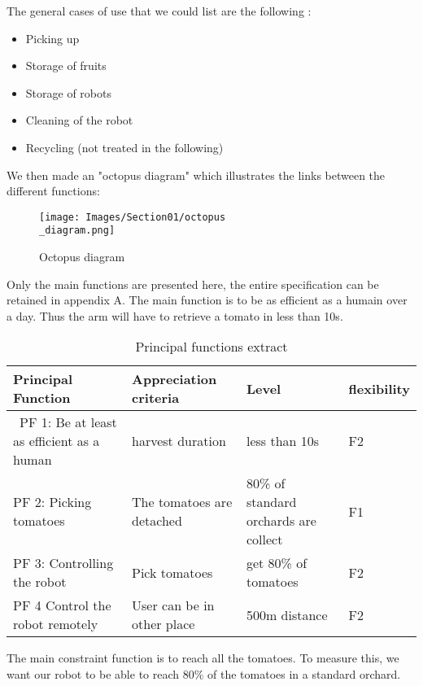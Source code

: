 \bigbreak
\noindent The general cases of use that we could list are the following : 
\begin{itemize}[noitemsep]
    \item Picking up
    \item Storage of fruits
    \item Storage of robots
    \item Cleaning of the robot
    \item Recycling (not treated in the following)
\end{itemize}

We then made an "octopus diagram" which illustrates the links between the different functions: 
\begin{figure}[ht]
    \centering
    \texttt{[image: Images/Section01/octopus\\\_diagram.png]}
    \caption{Octopus diagram}
    \label{fig:octopus}
\end{figure}

\bigbreak
Only the main functions are presented here, the entire specification can be retained in appendix A. The main function is to be as efficient as a humain over a day. Thus the arm will have to retrieve a tomato in less than 10s. 

\begin{table}[ht]
    \centering  
    \begin{tabular}{|p{3cm} | p{3cm} | p{3cm} | p{3cm} |} 
        \hline
        \textbf{Principal Function} & \textbf{Appreciation criteria} & \textbf{Level} & \textbf{flexibility} \\ [0.5ex] 
        \hline\
        PF 1: Be at least as efficient as a human & harvest duration & less than 10s & F2 \\ 
        \hline
        PF 2: Picking tomatoes & The tomatoes are detached & 80\% of standard orchards are collect & F1 \\
        \hline
        PF 3: Controlling the robot & Pick tomatoes & get 80\% of tomatoes & F2 \\
        \hline
        PF 4 Control the robot remotely  & User can be in other place & 500m distance & F2 \\
        \hline
    \end{tabular}
    \caption{Principal functions extract}
\end{table}
\FloatBarrier

\bigbreak
The main constraint function is to reach all the tomatoes. To measure this, we want our robot to be able to reach 80\% of the tomatoes in a standard orchard. 

